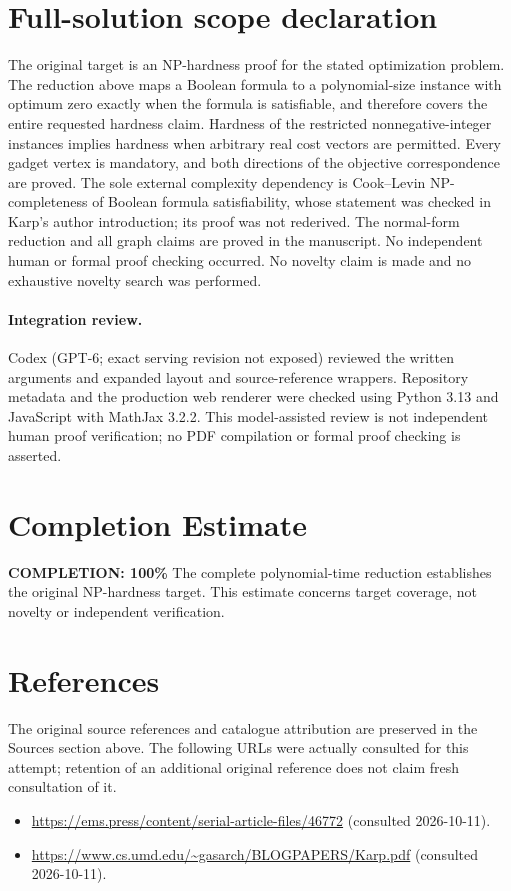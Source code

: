 \documentclass[11pt]{article}
\begin{document}
\section{Full-solution scope declaration}
The original target is an NP-hardness proof for the stated optimization problem.
The reduction above maps a Boolean formula to a polynomial-size instance with
optimum zero exactly when the formula is satisfiable, and therefore covers the
entire requested hardness claim. Hardness of the restricted nonnegative-integer
instances implies hardness when arbitrary real cost vectors are permitted. Every
gadget vertex is mandatory, and both directions of the objective correspondence
are proved. The sole external complexity dependency is Cook--Levin NP-completeness
of Boolean formula satisfiability, whose statement was checked in Karp's author
introduction; its proof was not rederived. The normal-form reduction and all graph
claims are proved in the manuscript. No independent human or formal proof checking
occurred. No novelty claim is made and no exhaustive novelty search was performed.
\paragraph{Integration review.} Codex (GPT-6; exact serving revision not exposed) reviewed the written arguments and expanded layout and source-reference wrappers. Repository metadata and the production web renderer were checked using Python 3.13 and JavaScript with MathJax 3.2.2. This model-assisted review is not independent human proof verification; no PDF compilation or formal proof checking is asserted.

\section{Completion Estimate}
\noindent\textbf{COMPLETION: 100\%}
The complete polynomial-time reduction establishes the original NP-hardness target.
This estimate concerns target coverage, not novelty or independent verification.
\section{References}
The original source references and catalogue attribution are preserved in the
Sources section above. The following URLs were actually consulted for this attempt;
retention of an additional original reference does not claim fresh consultation of it.
\begin{itemize}
\item \url{https://ems.press/content/serial-article-files/46772} (consulted 2026-10-11). 
\item \url{https://www.cs.umd.edu/~gasarch/BLOGPAPERS/Karp.pdf} (consulted 2026-10-11). 
\end{itemize}
\end{document}
